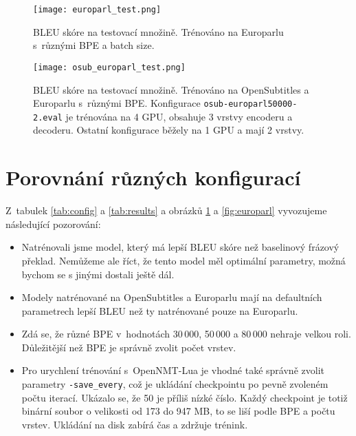 \documentclass[a4]{article}
\begin{document}
\begin{figure}[p]
\centering
  \texttt{[image: europarl\_test.png]}
    \caption{BLEU skóre na testovací množině. Trénováno na Europarlu
	s~různými BPE a batch size.}
  \label{fig:europarl}
  \texttt{[image: osub\_europarl\_test.png]}
    \caption{BLEU skóre na testovací množině. Trénováno na OpenSubtitles a Europarlu
	s~různými BPE. Konfigurace \texttt{osub-europarl50000-2.eval} je trénována
	na 4 GPU, obsahuje 3 vrstvy encoderu a decoderu. Ostatní konfigurace běžely
	na 1 GPU a mají 2 vrstvy.}
  \label{fig:osub}
\end{figure}



\section{Porovnání různých konfigurací}

Z~tabulek \ref{tab:config} a \ref{tab:results} a obrázků 
\ref{fig:osub} a \ref{fig:europarl} vyvozujeme následující pozorování:

\begin{itemize}

\item Natrénovali jsme model, který má lepší BLEU skóre než baselinový frázový
překlad. Nemůžeme ale říct, že tento model měl optimální parametry, možná
bychom se s jinými dostali ještě dál.

\item Modely natrénované na OpenSubtitles a Europarlu mají na defaultních
parametrech lepší BLEU než ty
natrénované pouze na Europarlu. 

\item Zdá se, že různé BPE v~hodnotách 30\,000, 50\,000 a 80\,000 nehraje
velkou roli. Důležitější než BPE je správně zvolit počet vrstev.

\item Pro urychlení trénování s~OpenNMT-Lua je vhodné také správně zvolit parametry
\texttt{-save\_every}, což je ukládání checkpointu po pevně zvoleném počtu
iterací. Ukázalo se, že 50 je příliš nízké číslo. Každý checkpoint je totiž
binární soubor o velikosti od 173 do 947 MB, to se liší podle BPE a počtu
vrstev. Ukládání na disk zabírá čas a zdržuje trénink.
  


\end{itemize}
\end{document}
